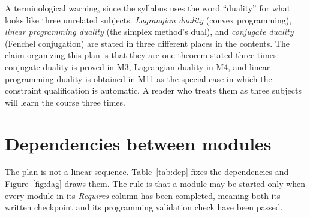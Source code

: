 \documentclass[11pt,a4paper]{article}
\begin{document}
A terminological warning, since the syllabus uses the word ``duality'' for what looks like
three unrelated subjects. \emph{Lagrangian duality} (convex programming), \emph{linear
programming duality} (the simplex method's dual), and \emph{conjugate duality} (Fenchel
conjugation) are stated in three different places in the contents. The claim organizing this
plan is that they are one theorem stated three times: conjugate duality is proved in M3,
Lagrangian duality in M4, and linear programming duality is obtained in M11 as the special
case in which the constraint qualification is automatic. A reader who treats them as three
subjects will learn the course three times.

\clearpage

\section{Dependencies between modules}

The plan is not a linear sequence. Table~\ref{tab:dep} fixes the dependencies and
Figure~\ref{fig:dag} draws them. The rule is that a module may be started only when every
module in its \emph{Requires} column has been completed, meaning both its written checkpoint
and its programming validation check have been passed.
\end{document}
